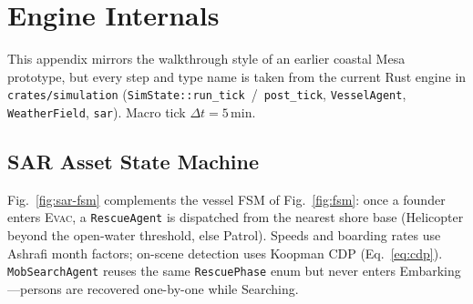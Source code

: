 \documentclass[cameraready]{Interspeech}
\begin{document}



\appendix

\section{Engine Internals}
\label{apx:engine}

This appendix mirrors the walkthrough style of an earlier coastal Mesa prototype, but every step and type name is taken from the current Rust engine in \texttt{crates/simulation} (\texttt{SimState::run\_tick}~/~\texttt{post\_tick}, \texttt{VesselAgent}, \texttt{WeatherField}, \texttt{sar}). Macro tick $\Delta t=5$\,min.

\subsection{SAR Asset State Machine}
\label{apx:sar-fsm}

Fig.~\ref{fig:sar-fsm} complements the vessel FSM of Fig.~\ref{fig:fsm}: once a founder enters \textsc{Evac}, a \texttt{RescueAgent} is dispatched from the nearest shore base (Helicopter beyond the open-water threshold, else Patrol). Speeds and boarding rates use Ashrafi month factors; on-scene detection uses Koopman CDP (Eq.~\ref{eq:cdp}). \texttt{MobSearchAgent} reuses the same \texttt{RescuePhase} enum but never enters Embarking---persons are recovered one-by-one while Searching.
\end{document}
